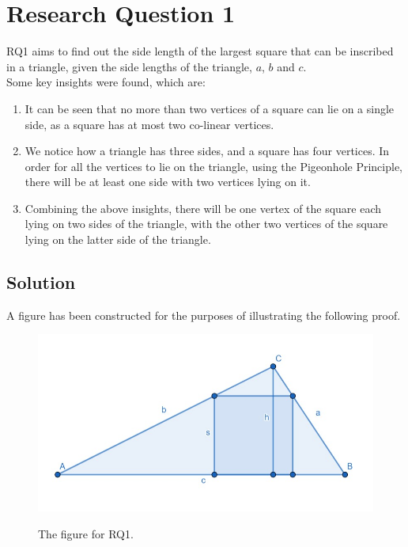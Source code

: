 \documentclass[12pt]{scrartcl}
\begin{document}
\section{Research Question 1}

RQ1 aims to find out the side length of the largest
square that can be inscribed in a triangle, given the side lengths of the triangle, $a$, $b$ and $c$. \\

Some key insights were found, which are: 
\begin{enumerate}
	\item It can be seen that no more than two vertices of a square can lie on a single side,
	      as a square has at most two co-linear vertices.
	\item We notice how a triangle has three sides, and a square has four vertices.
	      In order for all the vertices to lie on the triangle, using the Pigeonhole Principle,
	      there will be at least one side with two vertices lying on it.
	\item Combining the above insights, there will be one vertex of the square
	      each lying on two sides of the triangle, with the other two vertices of the square
	      lying on the latter side of the triangle.
\end{enumerate}

\subsection{Solution}
A figure has been constructed for the purposes of illustrating the following proof.
\begin{figure}[htpb]
	\centering
	\includegraphics[scale=.75]{images/rq1.jpg}
	\label{fig:rq1_img}
	\caption{The figure for RQ1.}
\end{figure}
\end{document}
